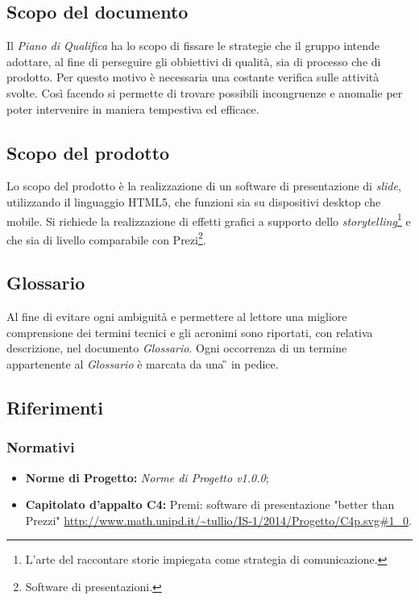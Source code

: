 \subsection{Scopo del documento}
Il \textit{Piano di Qualifica} ha lo scopo di fissare le strategie che il gruppo intende adottare, al fine di perseguire gli obbiettivi di qualità, sia di processo che di prodotto. Per questo motivo è necessaria una costante verifica sulle attività svolte. Così facendo si permette di trovare possibili incongruenze e anomalie per poter intervenire in maniera tempestiva ed efficace.
\subsection{Scopo del prodotto}
Lo scopo del prodotto è la realizzazione di un software di presentazione di \textit{slide}, utilizzando il linguaggio HTML5, che funzioni sia su dispositivi desktop che mobile. Si richiede la realizzazione di effetti grafici a supporto dello \textit{storytelling}\footnote{L'arte del raccontare storie impiegata come strategia di comunicazione.} e che sia di livello comparabile con Prezi\footnote{Software di presentazioni.}.
\subsection{Glossario}
Al fine di evitare ogni ambiguità e permettere al lettore una migliore comprensione dei termini tecnici e gli acronimi sono riportati, con relativa descrizione, nel documento \textit{Glossario}. 
Ogni occorrenza di un termine appartenente al \textit{Glossario} è marcata da una \G{} in pedice.
\subsection{Riferimenti}
	\subsubsection{Normativi}
	\begin{itemize}
		\item \textbf{Norme di Progetto:} \textit{Norme di Progetto v1.0.0};
		\item \textbf{Capitolato d'appalto C4:} Premi: software di presentazione "better than Prezzi" \url{http://www.math.unipd.it/~tullio/IS-1/2014/Progetto/C4p.svg#1_0}.
	\end{itemize}
